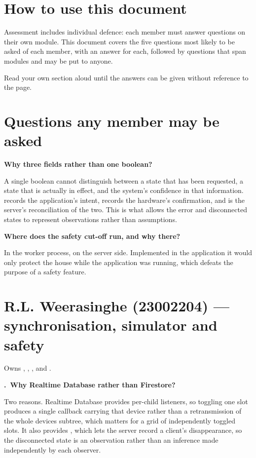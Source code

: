 \documentclass[11pt,a4paper]{article}
\newcounter{qnum}[section]
\newcommand{\question}[1]{%
  \refstepcounter{qnum}%
  \par\vspace{0.9em}%
  \noindent\textbf{\theqnum.\ #1}\par\vspace{0.25em}%
}
\newcommand{\shared}[1]{%
  \par\vspace{0.7em}\noindent\textbf{#1}\par\vspace{0.25em}%
}
\begin{document}

\section*{How to use this document}

Assessment includes individual defence: each member must answer questions on
their own module. This document covers the five questions most likely to be
asked of each member, with an answer for each, followed by questions that span
modules and may be put to anyone.

Read your own section aloud until the answers can be given without reference to
the page.

\section{Questions any member may be asked}

\shared{Why three fields rather than one boolean?}

A single boolean cannot distinguish between a state that has been requested, a
state that is actually in effect, and the system's confidence in that
information.  records the application's intent,
 records the hardware's confirmation, and  is
the server's reconciliation of the two. This is what allows the error and
disconnected states to represent observations rather than assumptions.

\shared{Where does the safety cut-off run, and why there?}

In the worker process, on the server side. Implemented in the application it
would only protect the house while the application was running, which defeats
the purpose of a safety feature.

\newpage
\section{R.L. Weerasinghe (23002204) --- synchronisation, simulator and safety}

Owns , , ,
 and .

\question{Why Realtime Database rather than Firestore?}

Two reasons. Realtime Database provides per-child listeners, so toggling one
slot produces a single callback carrying that device rather than a
retransmission of the whole devices subtree, which matters for a grid of
independently toggled slots. It also provides , which lets
the server record a client's disappearance, so the disconnected state is an
observation rather than an inference made independently by each observer.
\end{document}
